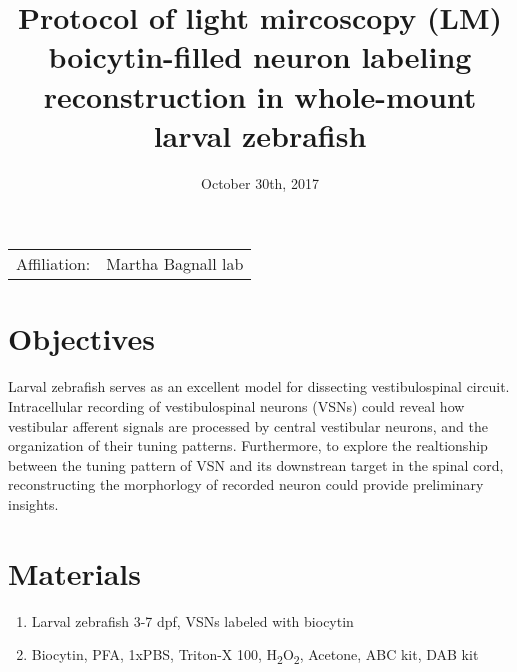 \documentclass[11pt]{article}
\title{Protocol of light mircoscopy (LM) boicytin-filled neuron labeling reconstruction in whole-mount larval zebrafish}
\date{October 30th, 2017}
\begin{document}
	\maketitle
	\thispagestyle{fancy}
	\begin{center}
		\begin{tabular}	{l r}
			Affiliation: & Martha Bagnall lab \\
		\end{tabular}
	\end{center}

\section{Objectives}
Larval zebrafish serves as an excellent model for dissecting vestibulospinal circuit. Intracellular recording of vestibulospinal neurons (VSNs) could reveal how vestibular afferent signals are processed by central vestibular neurons, and the organization of their tuning patterns. Furthermore, to explore the realtionship between the tuning pattern of VSN and its downstrean target in the spinal cord, reconstructing the morphorlogy of recorded neuron could provide preliminary insights.

\section{Materials}
	\begin{enumerate}[label=(\alph*)]
		\item Larval zebrafish 3-7 dpf, VSNs labeled with biocytin
		\item Biocytin, PFA, 1xPBS, Triton-X 100, H\textsubscript{2}O\textsubscript{2}, Acetone, ABC kit, DAB kit
	\end{enumerate}
\end{document}
